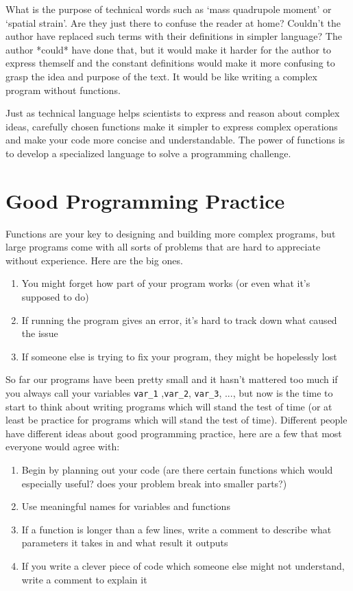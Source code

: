 What is the purpose of technical words such as `mass quadrupole moment' or `spatial strain'. Are they just there to confuse the reader at home? Couldn't the author have replaced such terms with their definitions in simpler language? The author *could* have done that, but it would make it harder for the author to express themself and the constant definitions would make it more confusing to grasp the idea and purpose of the text. It would be like writing a complex program without functions.

Just as technical language helps scientists to express and reason about complex ideas, carefully chosen functions make it simpler to express complex operations and make your code more concise and understandable. The power of functions is to develop a specialized language to solve a programming challenge.


\section*{Good Programming Practice}

Functions are your key to designing and building more complex programs, but large programs come with all sorts of problems that are hard to appreciate without experience. Here are the big ones.

\begin{enumerate}
\item You might forget how part of your program works (or even what it's supposed to do)
\item If running the program gives an error, it's hard to track down what caused the issue
\item If someone else is trying to fix your program, they might be hopelessly lost
\end{enumerate}

So far our programs have been pretty small and it hasn't mattered too much if you always call your variables \texttt{var\_1} ,\texttt{var\_2}, \texttt{var\_3}, ..., but now is the time to start to think about writing programs which will stand the test of time (or at least be practice for programs which will stand the test of time). Different people have different ideas about good programming practice, here are a few that most everyone would agree with:

\begin{enumerate}
\item Begin by planning out your code (are there certain functions which would especially useful? does your problem break into smaller parts?)
\item Use meaningful names for variables and functions
\item If a function is longer than a few lines, write a comment to describe what parameters it takes in and what result it outputs
\item If you write a clever piece of code which someone else might not understand, write a comment to explain it
\end{enumerate}